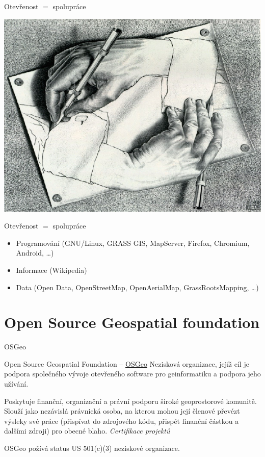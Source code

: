 \documentclass{beamer}
\begin{document}
\begin{frame}{Otevřenost $=$ spolupráce}
        \begin{center}
            \includegraphics[width=\textheight]{imgs/ils/escher.jpg}
        \end{center}
\end{frame}

\begin{frame}{Otevřenost $=$ spolupráce}
    \begin{itemize}
        \item Programování (GNU/Linux, GRASS GIS, MapServer, Firefox, Chromium,
        Android, \dots)
            \pause
        \item Informace (Wikipedia)
            \pause
        \item Data (Open Data, OpenStreetMap, OpenAerialMap, GrassRootsMapping,
        \dots)
    \end{itemize}
\end{frame}

\section{Open Source Geospatial foundation}

\begin{frame}{OSGeo}
\begin{block}{Open Source Geospatial Foundation -- \href{http://osgeo.org}{OSGeo}}
Nezisková organizace, jejíž cíl je podpora společného vývoje otevřeného software
pro geinformatiku a podpora jeho užívání. 

Poskytuje finanční, organizační a právní podporu široké geoprostorové komunitě.
Slouží jako nezávislá právnická osoba, na kterou mohou její členové převézt
výsleky své práce (přispívat do zdrojového kódu, přispět finanční částkou a
dalšími zdroji) pro obecné blaho. {\em Certifikace projektů}

OSGeo požívá status US 501(c)(3) neziskové organizace.
\end{block}
\end{frame}
\end{document}
